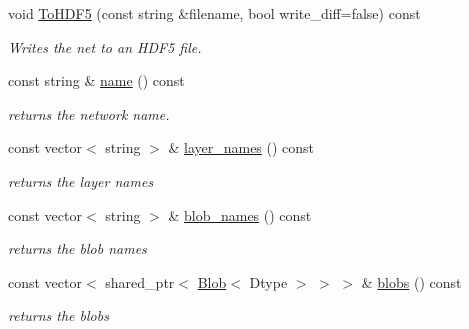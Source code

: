\begin{DoxyCompactItemize}
\mbox{\label{classcaffe_1_1_net_ad3ac317bbc872bc6ed48d19f4d986ecc}} 
void \mbox{\hyperlink{classcaffe_1_1_net_ad3ac317bbc872bc6ed48d19f4d986ecc}{To\+H\+D\+F5}} (const string \&filename, bool write\+\_\+diff=false) const
\begin{DoxyCompactList}\small\item\em Writes the net to an H\+D\+F5 file. \end{DoxyCompactList}\item 
\mbox{\label{classcaffe_1_1_net_a521c084f91eefc041bd53f30f1cc1097}} 
const string \& \mbox{\hyperlink{classcaffe_1_1_net_a521c084f91eefc041bd53f30f1cc1097}{name}} () const
\begin{DoxyCompactList}\small\item\em returns the network name. \end{DoxyCompactList}\item 
\mbox{\label{classcaffe_1_1_net_aa550ba424fc7b90f2ccbbaa175c1ec18}} 
const vector$<$ string $>$ \& \mbox{\hyperlink{classcaffe_1_1_net_aa550ba424fc7b90f2ccbbaa175c1ec18}{layer\+\_\+names}} () const
\begin{DoxyCompactList}\small\item\em returns the layer names \end{DoxyCompactList}\item 
\mbox{\label{classcaffe_1_1_net_aeaf1e942f1552b9c48bd9e834ede20e6}} 
const vector$<$ string $>$ \& \mbox{\hyperlink{classcaffe_1_1_net_aeaf1e942f1552b9c48bd9e834ede20e6}{blob\+\_\+names}} () const
\begin{DoxyCompactList}\small\item\em returns the blob names \end{DoxyCompactList}\item 
\mbox{\label{classcaffe_1_1_net_ab64573aa9187fb7540825d9338807a79}} 
const vector$<$ shared\+\_\+ptr$<$ \mbox{\hyperlink{classcaffe_1_1_blob}{Blob}}$<$ Dtype $>$ $>$ $>$ \& \mbox{\hyperlink{classcaffe_1_1_net_ab64573aa9187fb7540825d9338807a79}{blobs}} () const
\begin{DoxyCompactList}\small\item\em returns the blobs \end{DoxyCompactList}\item 

\end{DoxyCompactItemize}
